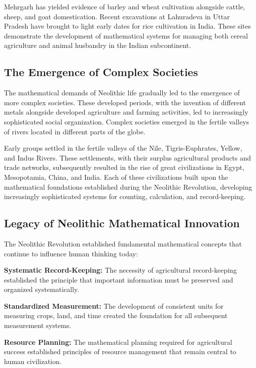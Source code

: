 \documentclass[12pt, oneside, openany]{book}
\begin{document}
Mehrgarh has yielded evidence of barley and wheat cultivation alongside cattle, sheep, and goat domestication. Recent excavations at Lahuradeva in Uttar Pradesh have brought to light early dates for rice cultivation in India. These sites demonstrate the development of mathematical systems for managing both cereal agriculture and animal husbandry in the Indian subcontinent.

\subsection{The Emergence of Complex Societies}

The mathematical demands of Neolithic life gradually led to the emergence of more complex societies. These developed periods, with the invention of different metals alongside developed agriculture and farming activities, led to increasingly sophisticated social organization. Complex societies emerged in the fertile valleys of rivers located in different parts of the globe.

Early groups settled in the fertile valleys of the Nile, Tigris-Euphrates, Yellow, and Indus Rivers. These settlements, with their surplus agricultural products and trade networks, subsequently resulted in the rise of great civilizations in Egypt, Mesopotamia, China, and India. Each of these civilizations built upon the mathematical foundations established during the Neolithic Revolution, developing increasingly sophisticated systems for counting, calculation, and record-keeping.

\subsection{Legacy of Neolithic Mathematical Innovation}

The Neolithic Revolution established fundamental mathematical concepts that continue to influence human thinking today:

\textbf{Systematic Record-Keeping:} The necessity of agricultural record-keeping established the principle that important information must be preserved and organized systematically.

\textbf{Standardized Measurement:} The development of consistent units for measuring crops, land, and time created the foundation for all subsequent measurement systems.

\textbf{Resource Planning:} The mathematical planning required for agricultural success established principles of resource management that remain central to human civilization.
\end{document}
